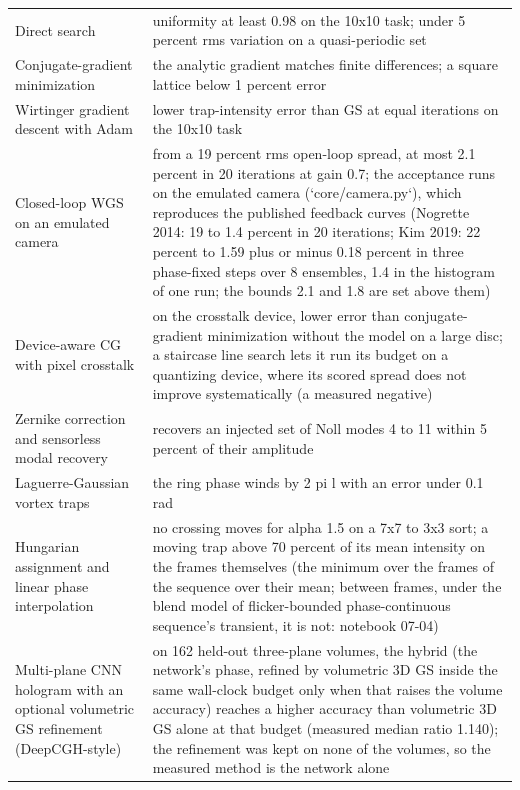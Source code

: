 \begin{longtable}{@{}>{\raggedright\arraybackslash}p{} >{\raggedright\arraybackslash}p{}@{}}
Direct search & \footnotesize uniformity at least 0.98 on the 10x10 task; under 5 percent rms variation on a quasi-periodic set\\
Conjugate-gradient minimization & \footnotesize the analytic gradient matches finite differences; a square lattice below 1 percent error\\
Wirtinger gradient descent with Adam & \footnotesize lower trap-intensity error than GS at equal iterations on the 10x10 task\\
Closed-loop WGS on an emulated camera & \footnotesize from a 19 percent rms open-loop spread, at most 2.1 percent in 20 iterations at gain 0.7; the acceptance runs on the emulated camera (`core/camera.py`), which reproduces the published feedback curves (Nogrette 2014: 19 to 1.4 percent in 20 iterations; Kim 2019: 22 percent to 1.59 plus or minus 0.18 percent in three phase-fixed steps over 8 ensembles, 1.4 in the histogram of one run; the bounds 2.1 and 1.8 are set above them)\\
Device-aware CG with pixel crosstalk & \footnotesize on the crosstalk device, lower error than conjugate-gradient minimization without the model on a large disc; a staircase line search lets it run its budget on a quantizing device, where its scored spread does not improve systematically (a measured negative)\\
Zernike correction and sensorless modal recovery & \footnotesize recovers an injected set of Noll modes 4 to 11 within 5 percent of their amplitude\\
Laguerre-Gaussian vortex traps & \footnotesize the ring phase winds by 2 pi l with an error under 0.1 rad\\
Hungarian assignment and linear phase interpolation & \footnotesize no crossing moves for alpha 1.5 on a 7x7 to 3x3 sort; a moving trap above 70 percent of its mean intensity on the frames themselves (the minimum over the frames of the sequence over their mean; between frames, under the blend model of flicker-bounded phase-continuous sequence's transient, it is not: notebook 07-04)\\
Multi-plane CNN hologram with an optional volumetric GS refinement (DeepCGH-style) & \footnotesize on 162 held-out three-plane volumes, the hybrid (the network's phase, refined by volumetric 3D GS inside the same wall-clock budget only when that raises the volume accuracy) reaches a higher accuracy than volumetric 3D GS alone at that budget (measured median ratio 1.140); the refinement was kept on none of the volumes, so the measured method is the network alone\\

\end{longtable}
